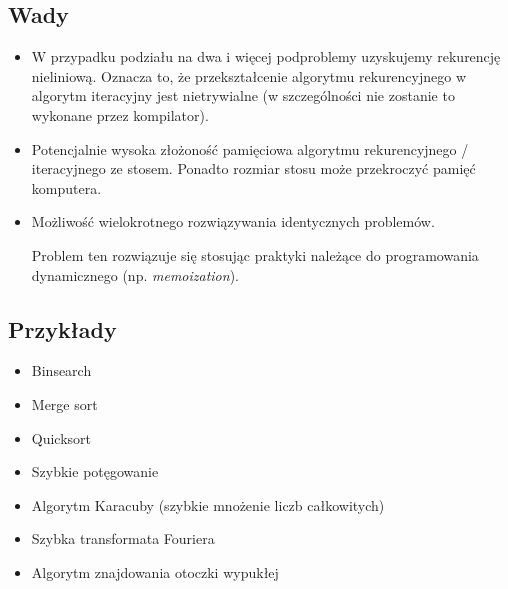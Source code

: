 \documentclass[12pt]{article}
\begin{document}
    \subsection{Wady}

    \begin{itemize}
        \item W przypadku podziału na dwa i więcej podproblemy uzyskujemy rekurencję nieliniową.
        Oznacza to, że przekształcenie algorytmu rekurencyjnego w algorytm iteracyjny
        jest nietrywialne (w szczególności nie zostanie to wykonane przez
        kompilator).


        \item Potencjalnie wysoka złożoność pamięciowa algorytmu rekurencyjnego / iteracyjnego ze stosem.
        Ponadto rozmiar stosu może przekroczyć pamięć komputera.


        \item Możliwość wielokrotnego rozwiązywania identycznych problemów.

        Problem ten rozwiązuje się stosując praktyki należące do programowania dynamicznego
        (np. \textit{memoization}).

    \end{itemize}

    \subsection{Przykłady}

    \begin{itemize}
        \item Binsearch
        \item Merge sort
        \item Quicksort
        \item Szybkie potęgowanie
        \item Algorytm Karacuby (szybkie mnożenie liczb całkowitych)
        \item Szybka transformata Fouriera
        \item Algorytm znajdowania otoczki wypukłej
    \end{itemize}


    \newpage
\end{document}
